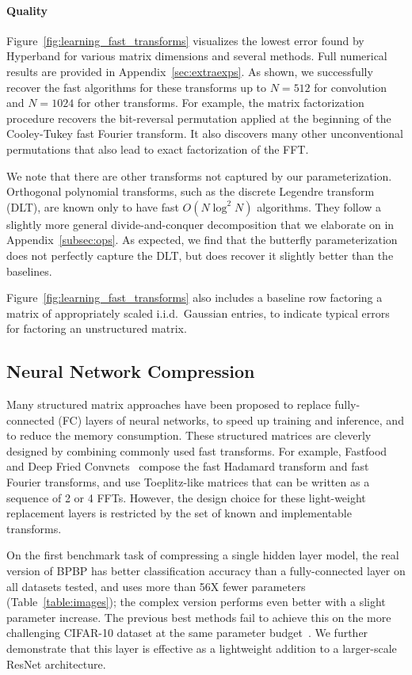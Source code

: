 \paragraph{Quality}
Figure~\ref{fig:learning_fast_transforms} visualizes the lowest error found by Hyperband for various matrix dimensions and several methods. Full numerical results are provided in Appendix~\ref{sec:extraexps}.
As shown, we successfully recover the fast algorithms for these transforms up to $N=512$ for convolution and $N=1024$ for other transforms. For example, the matrix factorization procedure recovers the bit-reversal permutation applied at the beginning of the Cooley-Tukey fast Fourier transform. It also discovers many other unconventional permutations that also lead to exact factorization of the FFT.

We note that there are other transforms not captured by our parameterization. Orthogonal polynomial transforms, such as the discrete Legendre transform (DLT), are known only to have fast $O(N \log^2 N)$ algorithms. They follow a slightly more general divide-and-conquer decomposition that we elaborate on in Appendix~\ref{subsec:ops}.
As expected, we find that the butterfly parameterization does not perfectly capture the DLT, but does recover it slightly better than the baselines. 

Figure~\ref{fig:learning_fast_transforms} also includes a baseline row factoring a matrix of appropriately scaled i.i.d.\ Gaussian entries, to indicate typical errors for factoring an unstructured matrix.

\subsection{Neural Network Compression}
\label{sec:applications}

Many structured matrix approaches have been proposed to replace fully-connected (FC) layers of neural networks, to speed up training and inference, and to reduce the memory consumption. These structured matrices are cleverly designed by combining commonly used fast transforms. For example, Fastfood~\citep{pmlr-v28-le13} and Deep Fried Convnets~\citep{yang2015deep} compose the fast Hadamard transform and fast Fourier transforms, and \citet{sindhwani2015structured} use Toeplitz-like matrices that can be written as a sequence of 2 or 4 FFTs. However, the design choice for these light-weight replacement layers is restricted by the set of known and implementable transforms.

On the first benchmark task of compressing a single hidden layer model, the real version of BPBP has better classification accuracy than a fully-connected layer on all datasets tested, and uses more than 56X fewer parameters (Table~\ref{table:images}); the complex version performs even better with a slight parameter increase. The previous best methods fail to achieve this on the more challenging CIFAR-10 dataset at the same parameter budget~\citep{thomas2018learning}. We further demonstrate that this layer is effective as a lightweight addition to a larger-scale ResNet architecture.

